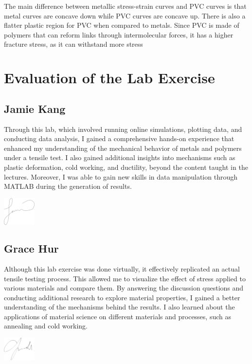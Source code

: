 \documentclass[11pt]{article}
\begin{document}
    The main difference between metallic stress-strain curves and PVC curves is that metal curves are concave down while PVC curves are concave up. 
    There is also a flatter plastic region for PVC when compared to metals. 
    Since PVC is made of polymers that can reform links through intermolecular forces, it has a higher fracture stress, as it can withstand more stress~\cite{Douglas2014} 

    \section{Evaluation of the Lab Exercise}
        \subsection{Jamie Kang}
            Through this lab, which involved running online simulations, plotting data, and conducting data analysis, I gained a comprehensive hands-on experience that enhanced my understanding of the mechanical behavior of metals and polymers under a tensile test.
            I also gained additional insights into mechanisms such as plastic deformation, cold working, and ductility, beyond the content taught in the lectures.
            Moreover, I was able to gain new skills in data manipulation through MATLAB during the generation of results.

            \bigskip
            \includegraphics[width=0.125\textwidth]{jamie.png}
        \subsection{Grace Hur}
            Although this lab exercise was done virtually, it effectively replicated an actual tensile testing process. 
            This allowed me to visualize the effect of stress applied to various materials and compare them.
            By answering the discussion questions and conducting additional research to explore material properties, I gained a better understanding of the mechanisms behind the results. 
            I also learned about the applications of material science on different materials and processes, such as annealing and cold working.

            \bigskip
            \includegraphics[width=0.125\textwidth]{grace.png}
\end{document}
